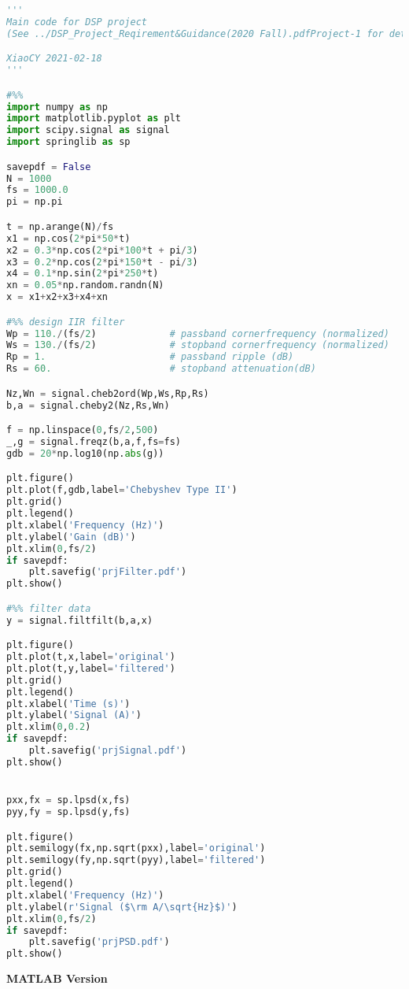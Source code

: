 \begin{lstlisting}[language=Python]
'''
Main code for DSP project
(See ../DSP_Project_Reqirement&Guidance(2020 Fall).pdfProject-1 for detail.)

XiaoCY 2021-02-18
'''

#%%
import numpy as np
import matplotlib.pyplot as plt
import scipy.signal as signal
import springlib as sp

savepdf = False
N = 1000
fs = 1000.0
pi = np.pi

t = np.arange(N)/fs
x1 = np.cos(2*pi*50*t)
x2 = 0.3*np.cos(2*pi*100*t + pi/3)
x3 = 0.2*np.cos(2*pi*150*t - pi/3)
x4 = 0.1*np.sin(2*pi*250*t)
xn = 0.05*np.random.randn(N)
x = x1+x2+x3+x4+xn

#%% design IIR filter
Wp = 110./(fs/2)             # passband cornerfrequency (normalized)
Ws = 130./(fs/2)             # stopband cornerfrequency (normalized)
Rp = 1.                      # passband ripple (dB)
Rs = 60.                     # stopband attenuation(dB)

Nz,Wn = signal.cheb2ord(Wp,Ws,Rp,Rs)
b,a = signal.cheby2(Nz,Rs,Wn)

f = np.linspace(0,fs/2,500)
_,g = signal.freqz(b,a,f,fs=fs)
gdb = 20*np.log10(np.abs(g))

plt.figure()
plt.plot(f,gdb,label='Chebyshev Type II')
plt.grid()
plt.legend()
plt.xlabel('Frequency (Hz)')
plt.ylabel('Gain (dB)')
plt.xlim(0,fs/2)
if savepdf: 
    plt.savefig('prjFilter.pdf')
plt.show()

#%% filter data
y = signal.filtfilt(b,a,x)

plt.figure()
plt.plot(t,x,label='original')
plt.plot(t,y,label='filtered')
plt.grid()
plt.legend()
plt.xlabel('Time (s)')
plt.ylabel('Signal (A)')
plt.xlim(0,0.2)
if savepdf:
    plt.savefig('prjSignal.pdf')
plt.show()


pxx,fx = sp.lpsd(x,fs)
pyy,fy = sp.lpsd(y,fs)

plt.figure()
plt.semilogy(fx,np.sqrt(pxx),label='original')
plt.semilogy(fy,np.sqrt(pyy),label='filtered')
plt.grid()
plt.legend()
plt.xlabel('Frequency (Hz)')
plt.ylabel(r'Signal ($\rm A/\sqrt{Hz}$)')
plt.xlim(0,fs/2)
if savepdf:
    plt.savefig('prjPSD.pdf')
plt.show()
\end{lstlisting}


{\noindent \bfseries MATLAB Version}


